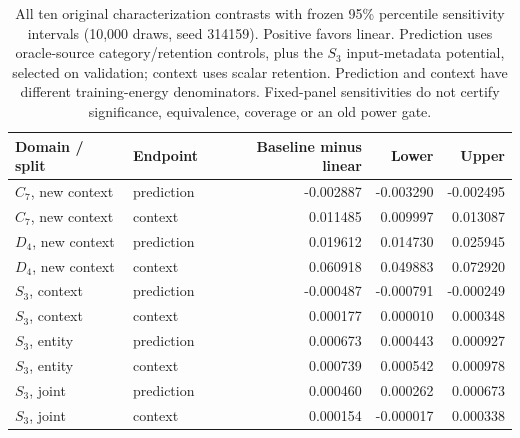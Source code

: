 \begin{table}[htbp]\centering\small
\begin{tabular}{llrrr}\toprule
Domain / split & Endpoint & Baseline minus linear & Lower & Upper \\
\midrule
$C_7$, new context & prediction & -0.002887 & -0.003290 & -0.002495 \\
$C_7$, new context & context & 0.011485 & 0.009997 & 0.013087 \\
$D_4$, new context & prediction & 0.019612 & 0.014730 & 0.025945 \\
$D_4$, new context & context & 0.060918 & 0.049883 & 0.072920 \\
$S_3$, context & prediction & -0.000487 & -0.000791 & -0.000249 \\
$S_3$, context & context & 0.000177 & 0.000010 & 0.000348 \\
$S_3$, entity & prediction & 0.000673 & 0.000443 & 0.000927 \\
$S_3$, entity & context & 0.000739 & 0.000542 & 0.000978 \\
$S_3$, joint & prediction & 0.000460 & 0.000262 & 0.000673 \\
$S_3$, joint & context & 0.000154 & -0.000017 & 0.000338 \\
\bottomrule\end{tabular}
\caption{All ten original characterization contrasts with frozen 95\% percentile sensitivity intervals (10,000 draws, seed 314159). Positive favors linear. Prediction uses oracle-source category/retention controls, plus the $S_3$ input-metadata potential, selected on validation; context uses scalar retention. Prediction and context have different training-energy denominators. Fixed-panel sensitivities do not certify significance, equivalence, coverage or an old power gate.}
\label{tab:characterization-intervals}\end{table}
